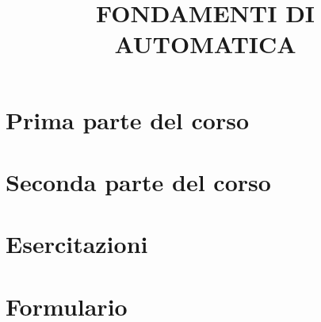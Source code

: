\documentclass[a4paper, 9pt]{article}
\title{FONDAMENTI DI AUTOMATICA}
\begin{document}
    \maketitle
    \tableofcontents{}
    \newpage
    \part{Prima parte del corso}
    
    
    
    
    
    
    
    
    
    
    
    \newpage
    \part{Seconda parte del corso}
    
    
    
    
    
    
    
    
    
    
    
    
    
    
    
    
    
    
    
    
    
    
    \newpage
    \part{Esercitazioni}
    
    
    
    
    
    
    
    \newpage
    \part{Formulario}
\end{document}

